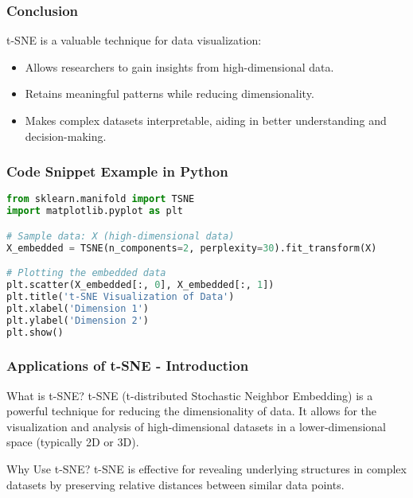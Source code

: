 \documentclass[aspectratio=169]{beamer}
\begin{document}
\begin{frame}[fragile]
    \frametitle{Conclusion}
    t-SNE is a valuable technique for data visualization:
    \begin{itemize}
        \item Allows researchers to gain insights from high-dimensional data.
        \item Retains meaningful patterns while reducing dimensionality.
        \item Makes complex datasets interpretable, aiding in better understanding and decision-making.
    \end{itemize}
\end{frame}

\begin{frame}[fragile]
    \frametitle{Code Snippet Example in Python}
    \begin{lstlisting}[language=Python]
from sklearn.manifold import TSNE
import matplotlib.pyplot as plt

# Sample data: X (high-dimensional data)
X_embedded = TSNE(n_components=2, perplexity=30).fit_transform(X)

# Plotting the embedded data
plt.scatter(X_embedded[:, 0], X_embedded[:, 1])
plt.title('t-SNE Visualization of Data')
plt.xlabel('Dimension 1')
plt.ylabel('Dimension 2')
plt.show()
    \end{lstlisting}
\end{frame}

\begin{frame}[fragile]
    \frametitle{Applications of t-SNE - Introduction}
    \begin{block}{What is t-SNE?}
        t-SNE (t-distributed Stochastic Neighbor Embedding) is a powerful technique for reducing the dimensionality of data. It allows for the visualization and analysis of high-dimensional datasets in a lower-dimensional space (typically 2D or 3D).
    \end{block}
    
    \begin{block}{Why Use t-SNE?}
        t-SNE is effective for revealing underlying structures in complex datasets by preserving relative distances between similar data points.
    \end{block}
\end{frame}
\end{document}
